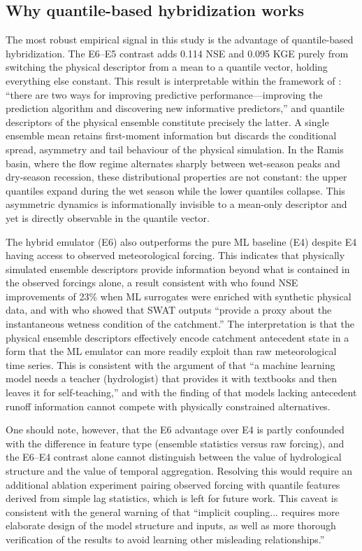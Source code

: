 \documentclass[a4paper,fleqn]{cas-sc}
\begin{document}
\subsection{Why quantile-based hybridization works}
\label{subsec:discussion-hybrid}

The most robust empirical signal in this study is the advantage of
quantile-based hybridization. The E6--E5 contrast adds 0.114 NSE and
0.095 KGE purely from switching the physical descriptor from a mean
to a quantile vector, holding everything else constant. This result
is interpretable within the framework of \citet{papacharalampous2022}:
``there are two ways for improving predictive performance---improving
the prediction algorithm and discovering new informative predictors,''
and quantile descriptors of the physical ensemble constitute precisely
the latter. A single ensemble mean retains first-moment information
but discards the conditional spread, asymmetry and tail behaviour of
the physical simulation. In the Ramis basin, where the flow regime
alternates sharply between wet-season peaks and dry-season recession,
these distributional properties are not constant: the upper quantiles
expand during the wet season while the lower quantiles collapse. This
asymmetric dynamics is informationally invisible to a mean-only
descriptor and yet is directly observable in the quantile vector.

The hybrid emulator (E6) also outperforms the pure ML baseline (E4)
despite E4 having access to observed meteorological forcing. This
indicates that physically simulated ensemble descriptors provide
information beyond what is contained in the observed forcings alone, a
result consistent with \citet{yang2020} who found NSE improvements of
23\% when ML surrogates were enriched with synthetic physical data, and
with \citet{mekonnen2015} who showed that SWAT outputs ``provide a
proxy about the instantaneous wetness condition of the catchment.''
The interpretation is that the physical ensemble descriptors
effectively encode catchment antecedent state in a form that the ML
emulator can more readily exploit than raw meteorological time series.
This is consistent with the argument of \citet{moreido2021} that ``a
machine learning model needs a teacher (hydrologist) that provides it
with textbooks and then leaves it for self-teaching,'' and with the
finding of \citet{okkan2021} that models lacking antecedent runoff
information cannot compete with physically constrained alternatives.

One should note, however, that the E6 advantage over E4 is partly
confounded with the difference in feature type (ensemble statistics
versus raw forcing), and the E6--E4 contrast alone cannot distinguish
between the value of hydrological structure and the value of temporal
aggregation. Resolving this would require an additional ablation
experiment pairing observed forcing with quantile features derived from
simple lag statistics, which is left for future work. This caveat is
consistent with the general warning of \citet{zhong2023} that
``implicit coupling... requires more elaborate design of the model
structure and inputs, as well as more thorough verification of the
results to avoid learning other misleading relationships.''
\end{document}

